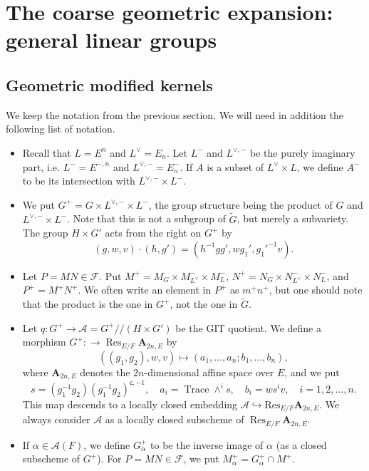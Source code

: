 \documentclass[letterpaper,11pt]{amsart}
\newcommand{\cA}{\mathcal{A}}
\newcommand{\cF}{\mathcal{F}}
\newcommand{\<}{\negthickspace}
\DeclareMathOperator{\Trace}{Trace}
\DeclareMathOperator{\Res}{Res}
\theoremstyle{definition}
\theoremstyle{plain}
\theoremstyle{remark}
\numberwithin{equation}{section}
\begin{document}
\section{The coarse geometric expansion: general linear groups}
\label{sec:geo_GL}

\subsection{Geometric modified kernels}
\label{subsec:geo_GL_modified_kernel}

We keep the notation from the previous section. We will need in addition the
following list of notation.

\begin{itemize}
\item Recall that $L = E^n$ and $L^\vee = E_n$. Let $L^-$ and $L^{\vee, -}$
    be the purely imaginary part, i.e. $L^- = E^{-, n}$ and $L^{\vee, -} =
    E_n^-$. If $A$ is a subset of $L^\vee \times L$, we define $A^-$ to be
    its intersection with $L^{\vee, -} \times L^-$.

\item We put $G^+ = G \times L^{\vee, -} \times L^-$, the group structure being
    the product of $G$ and $L^{\vee, -} \times L^-$. Note that this is not a
    subgroup of $\widetilde{G}$, but merely a subvariety.
    The group $H \times G'$ acts from the right on $G^+$ by
    \begin{equation}    \label{eq:action_G^+}
    (g,w,v) \cdot (h,g') = (h^{-1}gg',w g_1',g_1'^{-1} v).
    \end{equation}

\item Let $P = MN \in \cF$. Put $M^+ = M_G \times
    M_{L^{\vee}}^{-} \times M_L^{-}$, $N^+ = N_G \times N_{L^{\vee}}^-
    \times N^{-}_L$, and $P^+ = M^+ N^+$. We often write an element in $P^+$ as
    $m^+n^+$, but one should note that the product is the one in $G^+$, not
    the one in $\widetilde{G}$.

\item Let $q: G^+ \to \cA= G^+//(H \times G')$ be     the GIT quotient. We define a morphism $G^+: \to \Res_{E/F} \mathbf{A}_{2n, E}$ by
        \begin{equation} \label{eq:gl_GIT_map}
        ((g_1, g_2), w, v) \mapsto (a_1, \hdots, a_n; b_1, \hdots, b_n),
        \end{equation}
        where $\mathbf{A}_{2n, E}$ denotes the $2n$-dimensional affine space over $E$, and we put
        \[
        s = (g_1^{-1} g_2)(g_1^{-1}g_2)^{\mathsf{c}, -1}, \quad
        a_i = \Trace \wedge^i s,
        \quad b_i = w  s^i v, \quad i = 1, 2, \hdots, n.
        \]
    This map descends to a locally closed embedding $\cA \hookrightarrow \mathrm{Res}_{E/F} \mathbf{A}_{2n, E}$. We always consider $\cA$ as a locally closed subscheme of $\Res_{E/F}\mathbf{A}_{2n, E}$.

\item If $\alpha \in \cA(F)$, we define $G^+_{\alpha}$ to be the inverse
    image of $\alpha$ (as a closed subscheme of $G^+$). For $P = MN \in \cF$, we put
    $M^+_{\alpha} = G^+_\alpha \cap M^+$.
\end{itemize}
\end{document}
